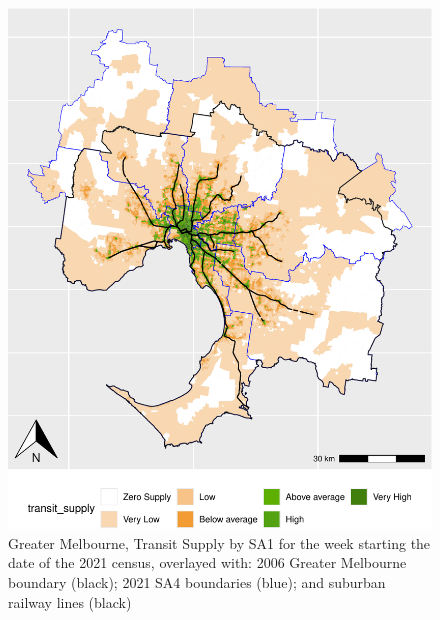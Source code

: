 \documentclass[preprint, 3p,
authoryear]{elsarticle} %
\begin{document}
\begin{figure}
\centering
\includegraphics{Leveraging_GTFS_to_assess_transit_supply_Transport_Geography_files/figure-latex/Greater_Melbourne_2016_2021_plot-1.pdf}
\caption{Greater Melbourne, Transit Supply by SA1 for the week starting
the date of the 2021 census, overlayed with: 2006 Greater Melbourne
boundary (black); 2021 SA4 boundaries (blue); and suburban railway lines
(black)}
\end{figure}
\end{document}
